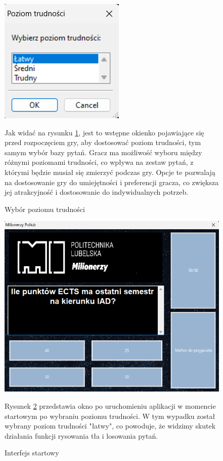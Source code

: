 \documentclass[]{article}
\begin{document}
\begin{figure}[!h]
	\includegraphics[width=\linewidth]{1.png}
	\caption{Wybór poziomu trudności}
	\label{rys:1}
	Jak widać na rysunku \ref{rys:1}, jest to wstępne okienko pojawiające się przed rozpoczęciem gry, aby dostosować poziom trudności, tym samym wybór bazy pytań. Gracz ma możliwość wyboru między różnymi poziomami trudności, co wpływa na zestaw pytań, z którymi będzie musiał się zmierzyć podczas gry. Opcje te pozwalają na dostosowanie gry do umiejętności i preferencji gracza, co zwiększa jej atrakcyjność i dostosowanie do indywidualnych potrzeb.
\end{figure}

\begin{figure}[!h]
	\includegraphics[width=\linewidth]{2.png}
	\caption{Interfejs startowy}
	\label{rys:2}
	Rysunek \ref{rys:2} przedstawia okno po uruchomieniu aplikacji w momencie startowym po wybraniu poziomu trudności. W tym wypadku został wybrany poziom trudności "łatwy", co powoduje, że widzimy skutek działania funkcji rysowania tła i losowania pytań.
\end{figure}
\end{document}
